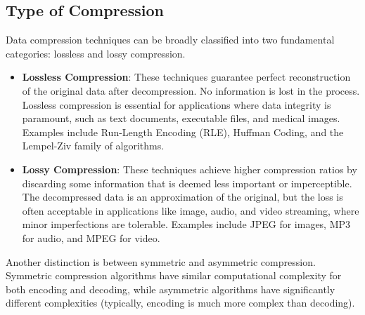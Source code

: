 \subsection{Type of Compression}
Data compression techniques can be broadly classified into two fundamental categories: lossless and lossy compression.
\begin{itemize}
    \item \textbf{Lossless Compression}: These techniques guarantee perfect reconstruction of the original data after decompression. No information is lost in the process. Lossless compression is essential for applications where data integrity is paramount, such as text documents, executable files, and medical images. Examples include Run-Length Encoding (RLE), Huffman Coding, and the Lempel-Ziv family of algorithms.
    \item \textbf{Lossy Compression}: These techniques achieve higher compression ratios by discarding some information that is deemed less important or imperceptible. The decompressed data is an approximation of the original, but the loss is often acceptable in applications like image, audio, and video streaming, where minor imperfections are tolerable. Examples include JPEG for images, MP3 for audio, and MPEG for video.
\end{itemize}
Another distinction is between symmetric and asymmetric compression. Symmetric compression algorithms have similar computational complexity for both encoding and decoding, while asymmetric algorithms have significantly different complexities (typically, encoding is much more complex than decoding).
